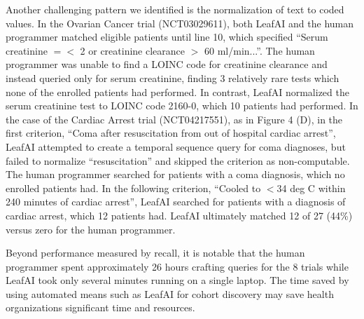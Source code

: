 \documentclass[../main.tex]{subfiles}
\begin{document}
Another challenging pattern we identified is the normalization of text to coded values. In the Ovarian Cancer trial (NCT03029611), both LeafAI and the human programmer matched eligible patients until line 10, which specified “Serum creatinine $=<$ 2 or creatinine clearance $>$ 60 ml/min...”. The human programmer was unable to find a LOINC code for creatinine clearance and instead queried only for serum creatinine, finding 3 relatively rare tests which none of the enrolled patients had performed. In contrast, LeafAI normalized the serum creatinine test to LOINC code 2160-0, which 10 patients had performed. In the case of the Cardiac Arrest trial (NCT04217551), as in Figure 4 (D), in the first criterion, “Coma after resuscitation from out of hospital cardiac arrest”, LeafAI attempted to create a temporal sequence query for coma diagnoses, but failed to normalize “resuscitation” and skipped the criterion as non-computable. The human programmer searched for patients with a coma diagnosis, which no enrolled patients had. In the following criterion, “Cooled to $<$34 deg C within 240 minutes of cardiac arrest”, LeafAI searched for patients with a diagnosis of cardiac arrest, which 12 patients had. LeafAI ultimately matched 12 of 27 (44\%) versus zero for the human programmer.  

Beyond performance measured by recall, it is notable that the human programmer spent approximately 26 hours crafting queries for the 8 trials while LeafAI took only several minutes running on a single laptop. The time saved by using automated means such as LeafAI for cohort discovery may save health organizations significant time and resources.
\end{document}
